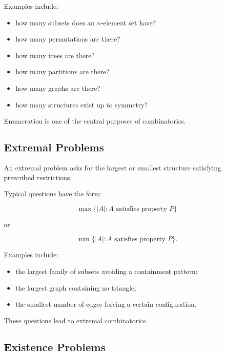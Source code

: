 Examples include:

\begin{itemize}
    \item how many subsets does an \(n\)-element set have?
    \item how many permutations are there?
    \item how many trees are there?
    \item how many partitions are there?
    \item how many graphs are there?
    \item how many structures exist up to symmetry?
\end{itemize}

Enumeration is one of the central purposes of combinatorics.

\subsection{Extremal Problems}
\label{subsec:extremal-discrete}

An extremal problem asks for the largest or smallest structure
satisfying prescribed restrictions.

Typical questions have the form:

\[
\boxed{
\max\{|A|:A\text{ satisfies property }P\}
}
\]

or

\[
\boxed{
\min\{|A|:A\text{ satisfies property }P\}.
}
\]

Examples include:

\begin{itemize}
    \item the largest family of subsets avoiding a containment pattern;
    \item the largest graph containing no triangle;
    \item the smallest number of edges forcing a certain configuration.
\end{itemize}

These questions lead to extremal combinatorics.

\subsection{Existence Problems}
\label{subsec:existence-discrete}

